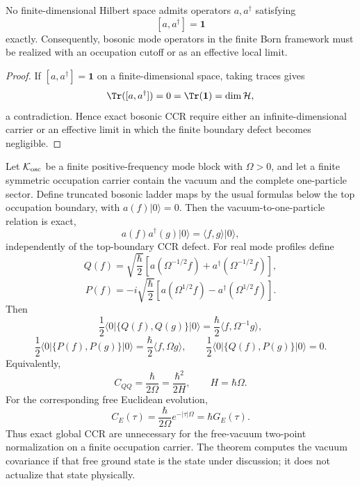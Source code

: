 \documentclass[12pt,a4paper]{article}
\begin{document}
\begin{proposition}
\label{p4:prop:no-exact-ccr}
\leavevmode\par\noindent
No finite-dimensional Hilbert space admits operators \(a,a^\dagger\) satisfying
\begin{equation}
\label{p4:eq:no-finite-ccr}
[a,a^\dagger]=\mathbf 1
\end{equation}
exactly.  Consequently, bosonic mode operators in the finite Born framework
must be realized with an occupation cutoff or as an effective local limit.
\end{proposition}


\begin{proof}
If $[a,a^\dagger]=\mathbf 1$ on a finite-dimensional space, taking traces gives
\[
\Tr([a,a^\dagger])=0=\Tr(\mathbf 1)=\dim \mathcal H,
\]
a contradiction.
Hence exact bosonic CCR require either an infinite-dimensional carrier or an effective limit in which the finite boundary defect becomes negligible.
\end{proof}


\begin{theorem}
\label{p4:thm:v245-finite-free-vacuum-covariance}
Let \(\mathcal K_{\rm osc}\) be a finite positive-frequency mode block with
\(\Omega>0\), and let a finite symmetric occupation carrier contain the
vacuum and the complete one-particle sector.  Define truncated bosonic ladder
maps by the usual formulas below the top occupation boundary, with
\(a(f)|0\rangle=0\).  Then the vacuum-to-one-particle relation is exact,
\[
 a(f)a^\dagger(g)|0\rangle=\langle f,g\rangle|0\rangle,
\]
independently of the top-boundary CCR defect.  For real mode profiles define
\[
 Q(f)=\sqrt{\frac{\hbar}{2}}
 \left[a(\Omega^{-1/2}f)+a^\dagger(\Omega^{-1/2}f)\right],
\]
\[
 P(f)=-i\sqrt{\frac{\hbar}{2}}
 \left[a(\Omega^{1/2}f)-a^\dagger(\Omega^{1/2}f)\right].
\]
Then
\[
 \boxed{\frac12\langle0|\{Q(f),Q(g)\}|0\rangle
 =\frac{\hbar}{2}\langle f,\Omega^{-1}g\rangle,}
\]
\[
 \boxed{\frac12\langle0|\{P(f),P(g)\}|0\rangle
 =\frac{\hbar}{2}\langle f,\Omega g\rangle,}
\qquad
 \boxed{\frac12\langle0|\{Q(f),P(g)\}|0\rangle=0.}
\]
Equivalently,
\[
 \boxed{C_{QQ}=\frac{\hbar}{2\Omega}
 =\frac{\hbar^2}{2H}},\qquad H=\hbar\Omega.
\]
For the corresponding free Euclidean evolution,
\[
 \boxed{C_E(\tau)=\frac{\hbar}{2\Omega}e^{-|\tau|\Omega}
 =\hbar G_E(\tau).}
\]
Thus exact global CCR are unnecessary for the free-vacuum two-point
normalization on a finite occupation carrier.  The theorem computes the
vacuum covariance if that free ground state is the state under discussion; it
does not actualize that state physically.
\end{theorem}
\end{document}
